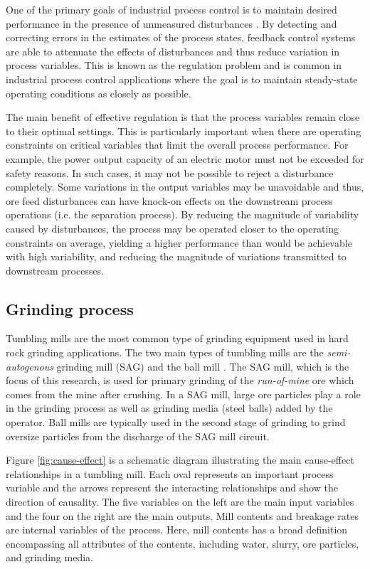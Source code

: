 One of the primary goals of industrial process control is to maintain desired performance in the presence of unmeasured disturbances \citep{astrom_computer_1997}. By detecting and correcting errors in the estimates of the process states, feedback control systems are able to attenuate the effects of disturbances and thus reduce variation in process variables. This is known as the regulation problem and is common in industrial process control applications where the goal is to maintain steady-state operating conditions as closely as possible.

The main benefit of effective regulation is that the process variables remain close to their optimal settings. This is particularly important when there are operating constraints on critical variables that limit the overall process performance. For example, the power output capacity of an electric motor must not be exceeded for safety reasons. In such cases, it may not be possible to reject a disturbance completely. Some variations in the output variables may be unavoidable and thus, ore feed disturbances can have knock-on effects on the downstream process operations (i.e. the separation process). By reducing the magnitude of variability caused by disturbances, the process may be operated closer to the operating constraints on average, yielding a higher performance than would be achievable with high variability, and reducing the magnitude of variations transmitted to downstream processes.

\subsection*{Grinding process}

Tumbling mills are the most common type of grinding equipment used in hard rock grinding applications. The two main types of tumbling mills are the \textit{semi-autogenous} grinding mill (SAG) and the ball mill \citep{king_chapter_2012}. The SAG mill, which is the focus of this research, is used for primary grinding of the \textit{run-of-mine} ore which comes from the mine after crushing. In a SAG mill, large ore particles play a role in the grinding process as well as grinding media (steel balls) added by the operator. Ball mills are typically used in the second stage of grinding to grind oversize particles from the discharge of the SAG mill circuit.

Figure \ref{fig:cause-effect} is a schematic diagram illustrating the main cause-effect relationships in a tumbling mill. Each oval represents an important process variable and the arrows represent the interacting relationships and show the direction of causality. The five variables on the left are the main input variables and the four on the right are the main outputs. Mill contents and breakage rates are internal variables of the process. Here, mill contents has a broad definition encompassing all attributes of the contents, including water, slurry, ore particles, and grinding media.

